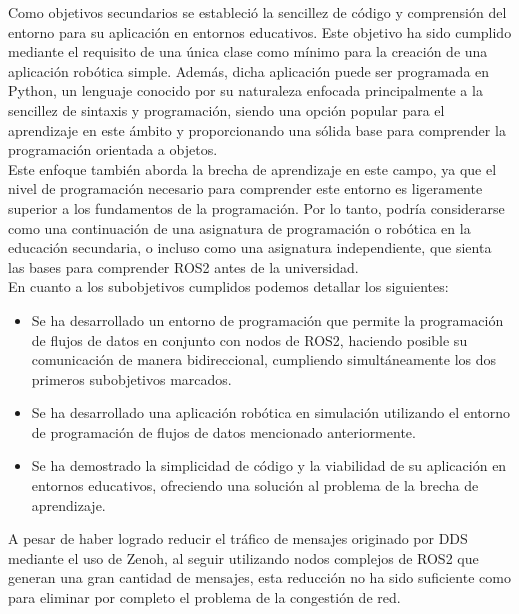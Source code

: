 Como objetivos secundarios se estableció la sencillez de código y comprensión
del entorno para su aplicación en entornos educativos.
Este objetivo ha sido cumplido mediante el requisito de una única clase como
mínimo para la creación de una aplicación robótica simple.
Además, dicha aplicación puede ser programada en Python, un lenguaje conocido
por su naturaleza enfocada principalmente a la sencillez de sintaxis y
programación, siendo una opción popular para el aprendizaje en este ámbito y
proporcionando una sólida base para comprender la programación orientada a
objetos.
\\

Este enfoque también aborda la brecha de aprendizaje en este campo, ya que el
nivel de programación necesario para comprender este entorno es ligeramente
superior a los fundamentos de la programación.
Por lo tanto, podría considerarse como una continuación de una asignatura de
programación o robótica en la educación secundaria, o incluso como una
asignatura independiente, que sienta las bases para comprender ROS2 antes de la
universidad.
\\

En cuanto a los subobjetivos cumplidos podemos detallar los siguientes:

\begin{itemize}
    \item{Se ha desarrollado un entorno de programación que permite la
        programación de flujos de datos en conjunto con nodos de ROS2, haciendo
        posible su comunicación de manera bidireccional, cumpliendo
        simultáneamente los dos primeros subobjetivos marcados.}
    \item{Se ha desarrollado una aplicación robótica en simulación utilizando el
        entorno de programación de flujos de datos mencionado anteriormente.}
    \item{Se ha demostrado la simplicidad de código y la viabilidad de su
        aplicación en entornos educativos, ofreciendo una solución al problema
        de la brecha de aprendizaje.}
\end{itemize}

A pesar de haber logrado reducir el tráfico de mensajes originado por DDS
mediante el uso de Zenoh, al seguir utilizando nodos complejos de ROS2 que
generan una gran cantidad de mensajes, esta reducción no ha sido suficiente como
para eliminar por completo el problema de la congestión de red.
\\

